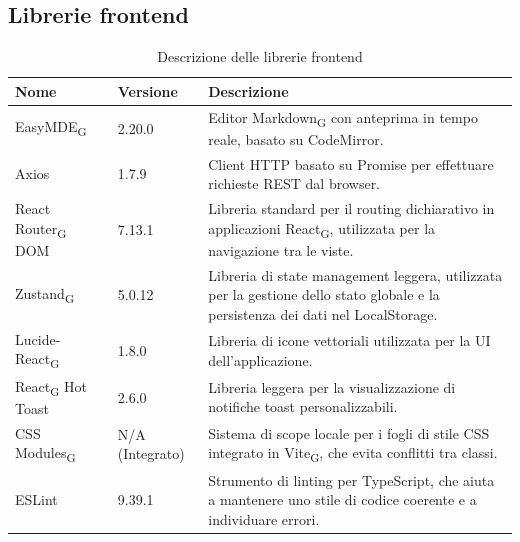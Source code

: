 \documentclass[11pt,a4paper]{article}
\newcommand{\gls}[1]{#1\textsubscript{G}}
\begin{document}
\subsection{Librerie frontend}
\begin{table}[H]
    \centering
    \begin{tabular}{|p{}|p{}|p{}|}
        \hline
        \textbf{Nome} & \textbf{Versione} & \textbf{Descrizione} \\
        \hline
        \gls{EasyMDE} & 2.20.0 & Editor \gls{Markdown} con anteprima in tempo reale, basato su CodeMirror. \\
        \hline
        Axios & 1.7.9 & Client HTTP basato su Promise per effettuare richieste REST dal browser. \\
        \hline
        \gls{React Router} DOM & 7.13.1 & Libreria standard per il routing dichiarativo in applicazioni \gls{React}, utilizzata per la navigazione tra le viste. \\
        \hline
        \gls{Zustand} & 5.0.12 & Libreria di state management leggera, utilizzata per la gestione dello stato globale e la persistenza dei dati nel LocalStorage. \\
        \hline
        Lucide-\gls{React} & 1.8.0 & Libreria di icone vettoriali utilizzata per la UI dell'applicazione. \\
        \hline
        \gls{React} Hot Toast & 2.6.0 & Libreria leggera per la visualizzazione di notifiche toast personalizzabili. \\
        \hline
        \gls{CSS Modules} & N/A (Integrato) & Sistema di scope locale per i fogli di stile CSS integrato in \gls{Vite}, che evita conflitti tra classi. \\
        \hline
        ESLint & 9.39.1 & Strumento di linting per TypeScript, che aiuta a mantenere uno stile di codice coerente e a individuare errori. \\
        \hline
    \end{tabular}
    \caption{Descrizione delle librerie frontend}
    \label{tab:librerie_frontend}
\end{table}
\end{document}
